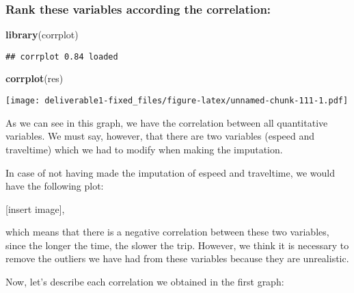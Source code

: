 \documentclass[
  18pt,
  a4paper]{article}
\newenvironment{Shaded}{\begin{snugshade}}{\end{snugshade}}
\newcommand{\KeywordTok}[1]{\textcolor[rgb]{0.13,0.29,0.53}{\textbf{#1}}}
\newcommand{\NormalTok}[1]{#1}
\begin{document}
\hypertarget{rank-these-variables-according-the-correlation}{%
\subsubsection{Rank these variables according the
correlation:}\label{rank-these-variables-according-the-correlation}}

\begin{Shaded}
\begin{Highlighting}[]
\KeywordTok{library}\NormalTok{(corrplot)}
\end{Highlighting}
\end{Shaded}

\begin{verbatim}
## corrplot 0.84 loaded
\end{verbatim}

\begin{Shaded}
\begin{Highlighting}[]
\KeywordTok{corrplot}\NormalTok{(res)}
\end{Highlighting}
\end{Shaded}

\texttt{[image: deliverable1-fixed\_files/figure-latex/unnamed-chunk-111-1.pdf]}

As we can see in this graph, we have the correlation between all
quantitative variables. We must say, however, that there are two
variables (espeed and traveltime) which we had to modify when making the
imputation.

In case of not having made the imputation of espeed and traveltime, we
would have the following plot:

{[}insert image{]},

which means that there is a negative correlation between these two
variables, since the longer the time, the slower the trip. However, we
think it is necessary to remove the outliers we have had from these
variables because they are unrealistic.

Now, let's describe each correlation we obtained in the first graph:
\end{document}
